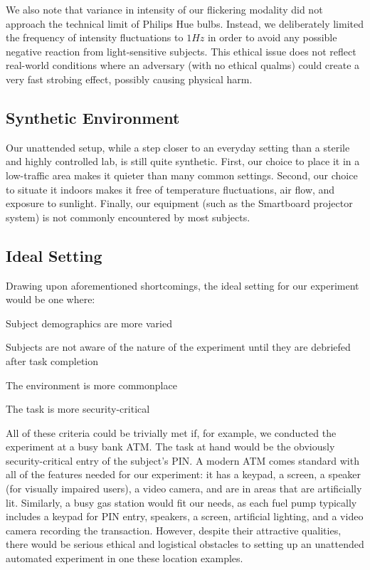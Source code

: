 \documentclass{llncs}
\begin{document}
We also note that variance in intensity of our flickering modality did not approach the 
technical limit of Philips Hue bulbs. Instead, we deliberately limited the frequency of 
intensity fluctuations to $1 Hz$ in order to avoid any possible negative reaction from 
light-sensitive subjects. This ethical issue does not reflect real-world conditions 
where an adversary (with no ethical qualms) could create a very fast strobing effect,
possibly causing physical harm.
%

\subsection{Synthetic Environment}
%
Our unattended setup, while a step closer to an everyday setting than a sterile and highly controlled lab, 
is still quite synthetic. First, our choice to place it in a low-traffic area makes it quieter than many common 
settings. Second, our choice to situate it indoors makes it free of temperature fluctuations, air flow, and 
exposure to sunlight. Finally, our equipment (such as the Smartboard projector system) is not 
commonly encountered by most subjects.

\subsection{Ideal Setting} \label{ideal}
%
Drawing upon aforementioned shortcomings, the ideal setting for our experiment would be one where:
%
\begin{compactitem}
\item Subject demographics are more varied
\item Subjects are not aware of the nature of the experiment until they are debriefed after task completion
\item The environment is more commonplace
\item The task is more security-critical
\end{compactitem}
%
All of these criteria could be trivially met if, for example, we conducted the experiment at a 
busy bank ATM. The task at hand would be the obviously security-critical entry 
of the subject's PIN. A modern ATM comes standard with all of the features needed for our experiment:
it has a keypad, a screen, a speaker (for visually impaired users), a video camera, and are in 
areas that are artificially lit. Similarly, a busy gas station would fit our needs, as each fuel pump 
typically includes a keypad for PIN entry, speakers, a screen, artificial lighting, and a video camera 
recording the transaction. However, despite their attractive qualities, 
there would be serious ethical and logistical obstacles to
setting up an unattended automated experiment in one these location examples.
\end{document}

